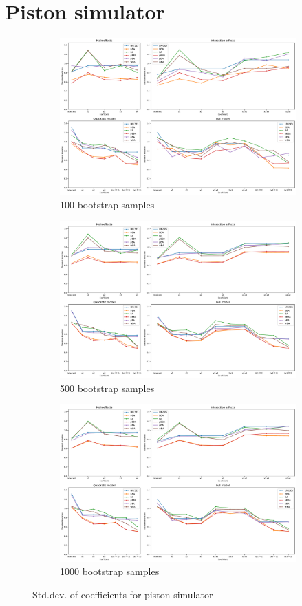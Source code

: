 \documentclass{article}
\begin{document}
\section{Piston simulator}
\begin{figure}
    \centering
    \begin{subfigure}{\textwidth}
        \includegraphics[width=0.8\linewidth]{figures/piston-std.pdf}
        \caption{100 bootstrap samples}
        \label{fig:piston-std-100}
    \end{subfigure}
    \begin{subfigure}{\textwidth}
        \includegraphics[width=0.8\linewidth]{figures/piston-std-500.pdf}
        \caption{500 bootstrap samples}
        \label{fig:piston-std-500}
    \end{subfigure}
    \begin{subfigure}{\textwidth}
        \includegraphics[width=0.8\linewidth]{figures/piston-std-1000.pdf}
        \caption{1000 bootstrap samples}
        \label{fig:piston-std-1000}
    \end{subfigure}
    \caption{Std.dev. of coefficients for piston simulator}
    \label{fig:piston-std}
\end{figure}
\end{document}
